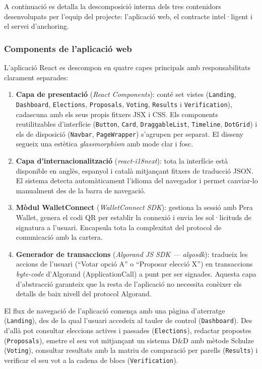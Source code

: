 A continuació es detalla la descomposició interna dels tres contenidors desenvolupats per l'equip del projecte: l'aplicació web, el contracte intel·ligent i el servei d'anchoring.
 
\subsubsection{Components de l'aplicació web}

L'aplicació React es descompon en quatre capes principals amb responsabilitats clarament separades:

\begin{enumerate}[label=\roman*.]
    \item \textbf{Capa de presentació} (\textit{React Components}): conté set vistes (\texttt{Landing}, \texttt{Dashboard}, \texttt{Elections}, \texttt{Proposals}, \texttt{Voting}, \texttt{Results} i \texttt{Verification}), cadascuna amb els seus propis fitxers JSX i CSS. Els components reutilitzables d'interfície (\texttt{Button}, \texttt{Card}, \texttt{DraggableList}, \texttt{Timeline}, \texttt{DotGrid}) i els de disposició (\texttt{Navbar}, \texttt{PageWrapper}) s'agrupen per separat. El disseny segueix una estètica \textit{glassmorphism} amb mode clar i fosc.

    \item \textbf{Capa d'internacionalització} (\textit{react-i18next}): tota la interfície està disponible en anglès, espanyol i català mitjançant fitxers de traducció JSON. El sistema detecta automàticament l'idioma del navegador i permet canviar-lo manualment des de la barra de navegació.

    \item \textbf{Mòdul WalletConnect} (\textit{WalletConnect SDK}): gestiona la sessió amb Pera Wallet, genera el codi QR per establir la connexió i envia les sol·licituds de signatura a l'usuari. Encapsula tota la complexitat del protocol de comunicació amb la cartera.

    \item \textbf{Generador de transaccions} (\textit{Algorand JS SDK --- algosdk}): tradueix les accions de l'usuari (``Votar opció A'' o ``Proposar elecció X'') en transaccions \textit{byte-code} d'Algorand (ApplicationCall) a punt per ser signades. Aquesta capa d'abstracció garanteix que la resta de l'aplicació no necessita conèixer els detalls de baix nivell del protocol Algorand.
\end{enumerate}

El flux de navegació de l'aplicació comença amb una pàgina d'aterratge (\texttt{Landing}), des de la qual l'usuari accedeix al tauler de control (\texttt{Dashboard}). Des d'allà pot consultar eleccions actives i passades (\texttt{Elections}), redactar propostes (\texttt{Proposals}), emetre el seu vot mitjançant un sistema D\&D amb mètode Schulze (\texttt{Voting}), consultar resultats amb la matriu de comparació per parells (\texttt{Results}) i verificar el seu vot a la cadena de blocs (\texttt{Verification}).


